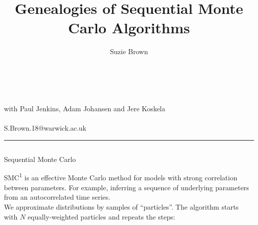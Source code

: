 \documentclass[final, 12pt]{beamer}
\title{Genealogies of Sequential Monte Carlo Algorithms}
\author{Suzie Brown}
\institute{Department of Statistics, University of Warwick}
\date{}
\newlength{\colwidth}
\begin{document}
\begin{frame}

\vspace*{-35pt}

\centering
{}

\vspace*{-250pt}

\huge{\inserttitle}\\[2pt]
\Large{\insertauthor}\\[7pt]
\large{with Paul Jenkins, Adam Johansen and Jere Koskela}\\[7pt]
\normalsize{\insertinstitute}\\[5pt]
\normalsize{S.Brown.18@warwick.ac.uk}\\[25pt]
\hrule

\vspace*{-10pt}

\begin{columns}
\begin{column}{\colwidth}
\begin{block}{Sequential Monte Carlo}

SMC\textsuperscript{1} is an effective Monte Carlo method for models with strong correlation between parameters. For example, inferring a sequence of underlying parameters from an autocorrelated time series.\\[12pt]

We approximate distributions by samples of ``particles''. The algorithm starts with $N$ equally-weighted particles and repeats the steps:
\begin{center}
\end{center}
\end{block}
\end{column}
\end{columns}
\end{frame}
\end{document}
